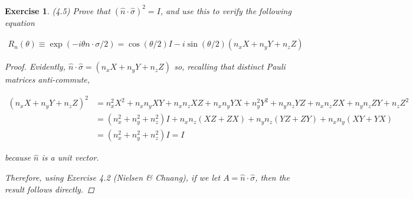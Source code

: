 \documentclass[11pt]{article}
\newcommand\0{\mathbf{0}}
\newcommand\<{\langle}
\renewcommand\>{\rangle}
\newtheorem{exercise}[theorem]{Exercise}
\begin{document}
\begin{exercise} (4.5) Prove that $(\hat{n} \cdot \hat{\sigma} ) ^2 = I$, and use this to verify the following equation

\begin{align*}
R_n(\theta) \equiv \exp(-i \theta n \cdot \sigma / 2) = \cos(\theta /2) I - i \sin(\theta / 2) (n_x X + n_y Y + n_z Z) 	
\end{align*}

\begin{proof}

Evidently, $\hat{n} \cdot \hat{\sigma} = (n_x X + n_y Y + n_z Z)$ so, recalling that distinct Pauli matrices anti-commute,

\begin{align*}
(n_x X + n_y Y + n_z Z)^2 &= n_x^2X^2 + n_xn_y XY + n_x n_z XZ + n_xn_y YX + n_y^2 Y^2 + n_yn_z YZ + n_x n_z ZX + n_y n_z ZY + n_z Z^2 \\
&= (n_x^2 + n_y^2 + n_z^2)I + n_xn_z(XZ + ZX) + n_yn_z (YZ + ZY) + n_x n_y (XY + YX) \\
&= (n_x^2 + n_y^2 + n_z^2)I = I
\end{align*}

because $\hat{n}$ is a unit vector. 
	
Therefore, using Exercise 4.2 (Nielsen \& Chuang), if we let $A = \hat{n} \cdot \hat{\sigma}$, then the result follows directly.  
\end{proof}
\end{exercise}

\end{document}
